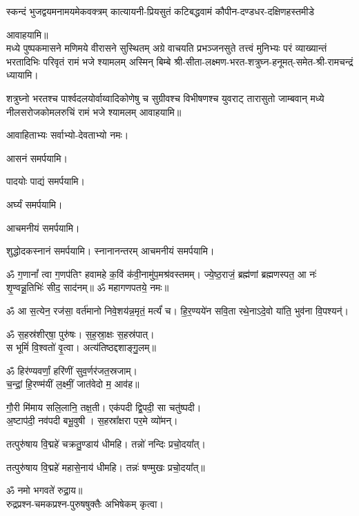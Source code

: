 \begin{center}
{स्कन्दं भुजद्वयमनामयमेकवक्त्रम्}
{कात्यायनी-प्रियसुतं कटिबद्धवामं}
{कौपीन-दण्डधर-दक्षिणहस्तमीडे}

आवाहयामि॥\\

{मध्ये पुष्पकमासने मणिमये वीरासने सुस्थितम्}
{अग्रे वाचयति प्रभञ्जनसुते तत्त्वं मुनिभ्यः परं}
{व्याख्यान्तं भरतादिभिः परिवृतं रामं भजे श्यामलम्}
अस्मिन् बिम्बे श्री-सीता-लक्ष्मण-भरत-शत्रुघ्न-हनूमत्-समेत-श्री-रामचन्द्रं ध्यायामि। 

{शत्रुघ्नो भरतश्च पार्श्वदलयोर्वाय्वादिकोणेषु च}
{सुग्रीवश्च विभीषणश्च युवराट् तारासुतो जाम्बवान्}
{मध्ये नीलसरोजकोमलरुचिं रामं भजे श्यामलम्}
आवाहयामि॥\\\medskip

आवाहिताभ्यः सर्वाभ्यो-देवताभ्यो नमः।

आसनं समर्पयामि।

पादयोः पाद्यं समर्पयामि।

अर्घ्यं समर्पयामि।

आचमनीयं समर्पयामि।

शुद्धोदकस्नानं समर्पयामि। स्नानानन्तरम् आचमनीयं समर्पयामि।



ॐ ग॒णानां᳚ त्वा ग॒णप॑तिꣳ हवामहे क॒विं क॑वी॒नामु॑प॒मश्र॑\-वस्तमम्। 
ज्ये॒ष्ठ॒राजं॒ ब्रह्म॑णां ब्रह्मणस्पत॒ आ नः॑ शृ॒ण्वन्नू॒तिभिः॑ सीद॒ साद॑नम्॥ 
ॐ महागणपतये॒ नमः॥ 

ॐ आ स॒त्येन॒ रज॑सा॒ वर्त॑मानो निवे॒शय॑न्न॒मृतं॒ मर्त्यं॑ च। हि॒र॒ण्यये॑न सवि॒ता रथे॒नाऽदे॒वो या॑ति॒ भुव॑ना वि॒पश्यन्॑।

ॐ स॒हस्र॑शीर्‌षा॒ पुरु॑षः। स॒ह॒स्रा॒क्षः स॒हस्र॑पात्।\\
स भूमिं॑ वि॒श्वतो॑ वृ॒त्वा। अत्य॑तिष्ठद्दशाङ्गु॒लम्॥

ॐ हिर॑ण्यवर्णां॒ हरि॑णीं सुव॒र्णर॑जत॒स्रजाम्।\\
च॒न्द्रां॒ हि॒रण्म॑यीं ल॒क्ष्मीं॒ जात॑वेदो म॒ आव॑ह॥

गौ॒री मि॑माय सलि॒लानि॒ तक्ष॒ती। एक॑पदी द्वि॒पदी॒ सा चतु॑ष्पदी।\\
अ॒ष्टाप॑दी॒ नव॑पदी बभू॒वुषी। स॒हस्रा᳚क्षरा पर॒मे व्यो॑मन्।

तत्पुरु॑षाय वि॒द्महे॑ चक्रतु॒ण्डाय॑ धीमहि। तन्नो॑ नन्दिः प्रचो॒दया᳚त्। 

तत्पुरु॑षाय वि॒द्महे॑ महासे॒नाय॑ धीमहि। तन्नः॑ षण्मुखः प्रचो॒दया᳚त्॥


ॐ नमो भगवते॑ रुद्रा॒य॥\\
रुद्रप्रश्न-चमकप्रश्न-पुरुषषुक्तैः अभिषेकम् कृत्वा।


\end{center}
